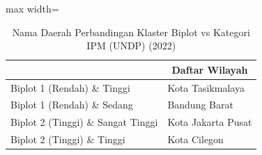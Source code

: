 \begin{table}[H]
\centering
\caption{Nama Daerah Perbandingan Klaster Biplot vs Kategori IPM (UNDP) (2022)} \label{tab:sample1crossname2022}
\begin{adjustbox}{max width=\textwidth}
\begin{tabular}{|>{\centering\arraybackslash}p{4cm}|p{10cm}|}
\hline
\multicolumn{1}{|c|}{\textbf{Kategori}} & \multicolumn{1}{c|}{\textbf{Daftar Wilayah}} \\
\hline
Biplot 1 (Rendah) \& Tinggi & Kota Tasikmalaya \\
\hline
Biplot 1 (Rendah) \& Sedang & Bandung Barat \\
\hline
Biplot 2 (Tinggi) \& Sangat Tinggi & Kota Jakarta Pusat \\
\hline
Biplot 2 (Tinggi) \& Tinggi & Kota Cilegon \\
\hline
\end{tabular}
\end{adjustbox}
\end{table}